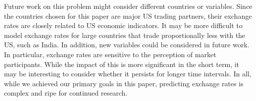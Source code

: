 \documentclass{sig-alternate-05-2015}
\begin{document}
Future work on this problem might consider different countries or variables. Since the countries chosen for this paper are major US trading partners, their exchange rates are closely related to US economic indicators. It may be more difficult to model exchange rates for large countries that trade proportionally less with the US, such as India. In addition, new variables could be considered in future work. In particular, exchange rates are sensitive to the perception of market participants. While the impact of this is more significant in the short term, it may be interesting to consider whether it persists for longer time intervals. In all, while we achieved our primary goals in this paper, predicting exchange rates is complex and ripe for continued research.  


     
\newenvironment{hangref}{\begin{list}{}{\setlength{\itemsep}{0pt}
\setlength{\parsep}{0pt}\setlength{\rightmargin}{0pt}
\setlength{\leftmargin}{+\parindent}
\setlength{\itemindent}{-\parindent}}}{\end{list}}
\end{document}
